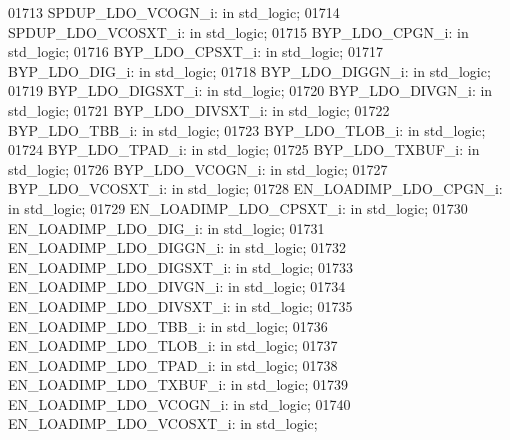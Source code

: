 \begin{DoxyCode}
01713     SPDUP\_LDO\_VCOGN\_i:  \textcolor{keywordflow}{in} \textcolor{comment}{std\_logic};
01714     SPDUP\_LDO\_VCOSXT\_i: \textcolor{keywordflow}{in} \textcolor{comment}{std\_logic};
01715     BYP\_LDO\_CPGN\_i: \textcolor{keywordflow}{in} \textcolor{comment}{std\_logic};
01716     BYP\_LDO\_CPSXT\_i:    \textcolor{keywordflow}{in} \textcolor{comment}{std\_logic};
01717     BYP\_LDO\_DIG\_i:  \textcolor{keywordflow}{in} \textcolor{comment}{std\_logic};
01718     BYP\_LDO\_DIGGN\_i:    \textcolor{keywordflow}{in} \textcolor{comment}{std\_logic};
01719     BYP\_LDO\_DIGSXT\_i:   \textcolor{keywordflow}{in} \textcolor{comment}{std\_logic};
01720     BYP\_LDO\_DIVGN\_i:    \textcolor{keywordflow}{in} \textcolor{comment}{std\_logic};
01721     BYP\_LDO\_DIVSXT\_i:   \textcolor{keywordflow}{in} \textcolor{comment}{std\_logic};
01722     BYP\_LDO\_TBB\_i:  \textcolor{keywordflow}{in} \textcolor{comment}{std\_logic};
01723     BYP\_LDO\_TLOB\_i: \textcolor{keywordflow}{in} \textcolor{comment}{std\_logic};
01724     BYP\_LDO\_TPAD\_i: \textcolor{keywordflow}{in} \textcolor{comment}{std\_logic};
01725     BYP\_LDO\_TXBUF\_i:    \textcolor{keywordflow}{in} \textcolor{comment}{std\_logic};
01726     BYP\_LDO\_VCOGN\_i:    \textcolor{keywordflow}{in} \textcolor{comment}{std\_logic};
01727     BYP\_LDO\_VCOSXT\_i:   \textcolor{keywordflow}{in} \textcolor{comment}{std\_logic};
01728     EN\_LOADIMP\_LDO\_CPGN\_i:  \textcolor{keywordflow}{in} \textcolor{comment}{std\_logic};
01729     EN\_LOADIMP\_LDO\_CPSXT\_i: \textcolor{keywordflow}{in} \textcolor{comment}{std\_logic};
01730     EN\_LOADIMP\_LDO\_DIG\_i:   \textcolor{keywordflow}{in} \textcolor{comment}{std\_logic};
01731     EN\_LOADIMP\_LDO\_DIGGN\_i: \textcolor{keywordflow}{in} \textcolor{comment}{std\_logic};
01732     EN\_LOADIMP\_LDO\_DIGSXT\_i:    \textcolor{keywordflow}{in} \textcolor{comment}{std\_logic};
01733     EN\_LOADIMP\_LDO\_DIVGN\_i: \textcolor{keywordflow}{in} \textcolor{comment}{std\_logic};
01734     EN\_LOADIMP\_LDO\_DIVSXT\_i:    \textcolor{keywordflow}{in} \textcolor{comment}{std\_logic};
01735     EN\_LOADIMP\_LDO\_TBB\_i:   \textcolor{keywordflow}{in} \textcolor{comment}{std\_logic};
01736     EN\_LOADIMP\_LDO\_TLOB\_i:  \textcolor{keywordflow}{in} \textcolor{comment}{std\_logic};
01737     EN\_LOADIMP\_LDO\_TPAD\_i:  \textcolor{keywordflow}{in} \textcolor{comment}{std\_logic};
01738     EN\_LOADIMP\_LDO\_TXBUF\_i: \textcolor{keywordflow}{in} \textcolor{comment}{std\_logic};
01739     EN\_LOADIMP\_LDO\_VCOGN\_i: \textcolor{keywordflow}{in} \textcolor{comment}{std\_logic};
01740     EN\_LOADIMP\_LDO\_VCOSXT\_i:    \textcolor{keywordflow}{in} \textcolor{comment}{std\_logic};

\end{DoxyCode}
